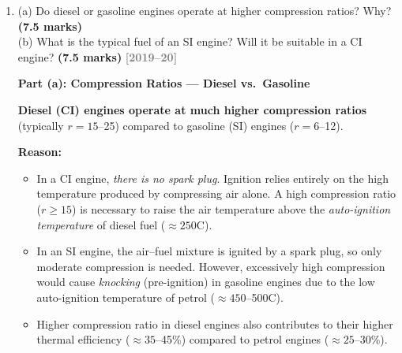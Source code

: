 \documentclass[12pt,a3paper]{article}
\newcommand{\yr}[1]{\hfill\textcolor{gray}{\small\textbf{[#1]}}}
\newcommand{\mk}[1]{\textcolor{orange!70!black}{\small\textbf{(#1 marks)}}}
\begin{document}
\begin{enumerate}
\begin{tcolorbox}[enhanced,breakable,ansbox,colback=cB!4,colframe=cB,
  boxrule=0.8pt,arc=5pt,
  title={\textbf{Answer}},fonttitle=\bfseries\color{white},colbacktitle=cB]
\textbf{(iv) Air standard MEP:}
\[
  W_{\text{net}} = \eta\times q_{\text{in}} = 0.6019\times150\times10^{-6}
  \approx 90.3\times10^{-6}\,\text{J}
\]
\[
  V_s = 200\,\text{cm}^3 = 200\times10^{-6}\,\text{m}^3
\]
\[
  \text{MEP} = \frac{W_{\text{net}}}{V_s}
  = \frac{90.3\times10^{-6}}{200\times10^{-6}}
  \approx \boxed{0.451\,\text{Pa}}
\]

\textit{Note: The very small heat input (150\,$\mu$J/cycle) gives a correspondingly
small MEP. In a real engine $q_{\text{in}}$ would be in kJ/kg, yielding MEP in the
range 800--1200\,kPa.}

\end{tcolorbox}

\item \label{qlabel:A2-Q3}
(a) Do diesel or gasoline engines operate at higher compression ratios? Why? \mk{7.5}\\
(b) What is the typical fuel of an SI engine? Will it be suitable in a CI engine? \mk{7.5}
\yr{2019--20}

\begin{tcolorbox}[enhanced,breakable,ansbox,colback=cB!4,colframe=cB,
  boxrule=0.8pt,arc=5pt,
  title={\textbf{Answer}},fonttitle=\bfseries\color{white},colbacktitle=cB]

\textbf{Part (a): Compression Ratios — Diesel vs.\ Gasoline}

\textbf{Diesel (CI) engines operate at much higher compression ratios} (typically
$r = 15$--25) compared to gasoline (SI) engines ($r = 6$--12).

\textbf{Reason:}
\begin{itemize}[leftmargin=1.5em,itemsep=2pt]
  \item In a CI engine, \emph{there is no spark plug}. Ignition relies entirely
        on the high temperature produced by compressing air alone. A high
        compression ratio ($r \geq 15$) is necessary to raise the air temperature
        above the \emph{auto-ignition temperature} of diesel fuel
        ($\approx 250$\textdegree C).
  \item In an SI engine, the air--fuel mixture is ignited by a spark plug, so
        only moderate compression is needed. However, excessively high
        compression would cause \emph{knocking} (pre-ignition) in gasoline
        engines due to the low auto-ignition temperature of petrol
        ($\approx 450$--500\textdegree C).
  \item Higher compression ratio in diesel engines also contributes to their
        higher thermal efficiency ($\approx 35$--45\%) compared to petrol engines
        ($\approx 25$--30\%).
\end{itemize}


\end{tcolorbox}
\end{enumerate}
\end{document}
